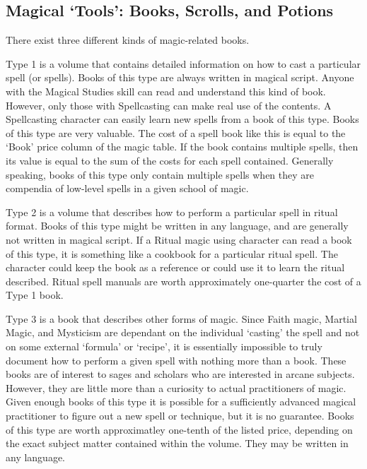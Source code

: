 \documentclass[twoside]{book}
\begin{document}
    

\subsection{Magical `Tools': Books, Scrolls, and
               Potions}
    
    {  
     There exist three different kinds of magic-related
               books. 
    }
  
    {  
     Type 1 is a volume that contains detailed
               information on how to cast a particular spell (or spells).
               Books of this type are always written in magical script.
               Anyone with the Magical Studies skill can read and
               understand this kind of book. However, only those with
               Spellcasting can make real use of the contents. A
               Spellcasting character can easily learn new spells from a
               book of this type. Books of this type are very valuable.
               The cost of a spell book like this is equal to the
               `Book' price column of the magic table. If the
               book contains multiple spells, then its value is equal to
               the sum of the costs for each spell contained. Generally
               speaking, books of this type only contain multiple spells
               when they are compendia of low-level spells in a given
               school of magic. 
    }
  
    {  
     Type 2 is a volume that describes how to perform a
               particular spell in ritual format. Books of this type
               might be written in any language, and are generally not
               written in magical script. If a Ritual magic using
               character can read a book of this type, it is something
               like a cookbook for a particular ritual spell. The
               character could keep the book as a reference or could use
               it to learn the ritual described. Ritual spell manuals are
               worth approximately one-quarter the cost of a Type 1 book.
               
    }
  
    {  
     Type 3 is a book that describes other forms of
               magic. Since Faith magic, Martial Magic, and Mysticism are
               dependant on the individual `casting' the
               spell and not on some external `formula' or
               `recipe', it is essentially impossible to
               truly document how to perform a given spell with nothing
               more than a book. These books are of interest to sages and
               scholars who are interested in arcane subjects. However,
               they are little more than a curiosity to actual
               practitioners of magic. Given enough books of this type it
               is possible for a sufficiently advanced magical
               practitioner to figure out a new spell or technique, but
               it is no guarantee. Books of this type are worth
               approximatley one-tenth of the listed price, depending on
               the exact subject matter contained within the volume. They
               may be written in any language. 
    }
  
\end{document}

